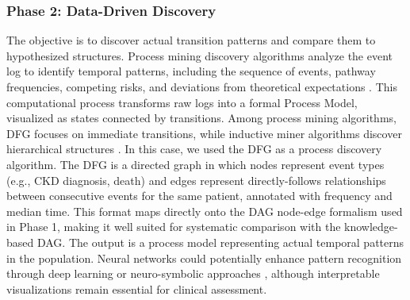 \documentclass[sn-vancouver-num]{sn-jnl}
\begin{document}
\subsubsection{Phase 2: Data-Driven Discovery}
The objective is to discover actual transition patterns and compare them to hypothesized structures. Process mining discovery algorithms analyze the event log to identify temporal patterns, including the sequence of events, pathway frequencies, competing risks, and deviations from theoretical expectations \citep{vanderaalst2016,mans2008,rebuge2012}. This computational process transforms raw logs into a formal Process Model, visualized as states connected by transitions. Among process mining algorithms, DFG focuses on immediate transitions, while inductive miner algorithms discover hierarchical structures \citep{vanderaalst2016}. In this case, we used the DFG as a process discovery algorithm. The DFG is a directed graph in which nodes represent event types (e.g., CKD diagnosis, death) and edges represent directly-follows relationships between consecutive events for the same patient, annotated with frequency and median time. This format maps directly onto the DAG node-edge formalism used in Phase 1, making it well suited for systematic comparison with the knowledge-based DAG. The output is a process model representing actual temporal patterns in the population. Neural networks could potentially enhance pattern recognition through deep learning \citep{miotto2018} or neuro-symbolic approaches \citep{garcez2023,bhuyan2024}, although interpretable visualizations remain essential for clinical assessment.
\end{document}
